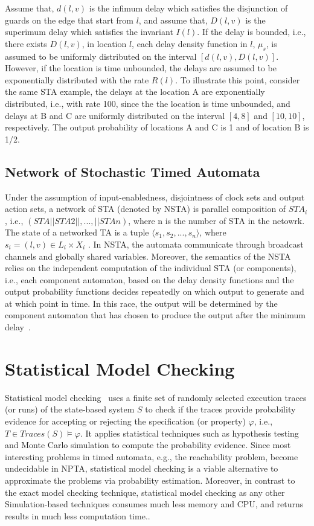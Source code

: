 Assume that, $d(l,v)$ is the infimum delay which satisfies the disjunction of guards on the edge that start from $l$, and assume that, $D(l,v)$ is the superimum delay which satisfies the invariant $I(l)$. If the delay is bounded, i.e., there exists $D(l,v)$, in location $l$, each delay density function in $l$, $\mu_s$, is assumed to be uniformly distributed on the interval $[d(l,v),D(l,v)]$. However, if the location is time unbounded, the delays are assumed to be exponentially distributed with the rate $R(l)$. To illustrate this point, consider the same STA example, the delays at the location A are exponentially distributed, i.e., with rate 100, since the the location is time unbounded, and delays at B and C are uniformly distributed on the interval $[4,8]$ and $[10,10]$, respectively. The output probability of locations A and C is 1 and of location B is 1/2. 

\subsection*{Network of Stochastic Timed Automata}
Under the assumption of input-enabledness, disjointness of clock sets and output action sets, a network of STA (denoted by NSTA) is parallel composition of $STA_i$, i.e., $(STA||STA2||,...,||STAn)$, where n is the number of STA in the netowrk.  The state of a networked TA is a tuple $\langle s_1,s_2,...,s_n\rangle$, where $s_i=(l,v)\in L_i\times X_i$ . In NSTA, the automata communicate through broadcast channels and globally shared variables. Moreover, the semantics of the NSTA relies on the independent computation of the individual STA (or components), i.e.,  each component automaton, based on the delay density functions and the output probability functions decides repeatedly on which output to generate and at which point in time. In this race, the output will be determined by the component automaton that has chosen to produce the output after the minimum delay~\cite{David2011StatisticalAutomata}.


\section{Statistical Model Checking}
Statistical model checking~\cite{Agha2018AChecking} uses a finite set of randomly selected execution traces (or runs) of the state-based system $S$ to check if the traces provide probability evidence for accepting or rejecting the specification (or property) $\varphi$, i.e., $T\in Traces(S)\models \varphi$. It applies statistical techniques such as hypothesis testing and Monte Carlo simulation to compute the probability evidence. Since most interesting problems in timed automata, e.g., the reachability problem, become undecidable in NPTA, statistical model checking is a viable alternative to approximate the problems via probability estimation. Moreover, in contrast to the exact model checking technique, statistical model checking as any other Simulation-based techniques consumes much less memory and CPU, and returns results in much less computation time..

